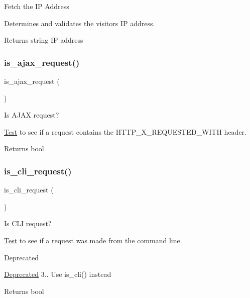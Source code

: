 Fetch the IP Address

Determines and validates the visitor\textquotesingle{}s IP address.

\begin{DoxyReturn}{Returns}
string IP address 
\end{DoxyReturn}
\mbox{\label{class_c_i___input_a4ae07120b0b2ace90eb2f7ec72b29426}} 
\subsubsection{\texorpdfstring{is\+\_\+ajax\+\_\+request()}{is\_ajax\_request()}}
{\footnotesize\ttfamily is\+\_\+ajax\+\_\+request (\begin{DoxyParamCaption}{ }\end{DoxyParamCaption})}

Is A\+J\+AX request?

\mbox{\hyperlink{class_test}{Test}} to see if a request contains the H\+T\+T\+P\+\_\+\+X\+\_\+\+R\+E\+Q\+U\+E\+S\+T\+E\+D\+\_\+\+W\+I\+TH header.

\begin{DoxyReturn}{Returns}
bool 
\end{DoxyReturn}
\mbox{\label{class_c_i___input_a70c1e8a081ef955c1a52164634d4f66e}} 
\subsubsection{\texorpdfstring{is\+\_\+cli\+\_\+request()}{is\_cli\_request()}}
{\footnotesize\ttfamily is\+\_\+cli\+\_\+request (\begin{DoxyParamCaption}{ }\end{DoxyParamCaption})}

Is C\+LI request?

\mbox{\hyperlink{class_test}{Test}} to see if a request was made from the command line.

\begin{DoxyRefDesc}{Deprecated}
\item[\mbox{\hyperlink{deprecated__deprecated000002}{Deprecated}}]3.. Use is\+\_\+cli() instead \end{DoxyRefDesc}
\begin{DoxyReturn}{Returns}
bool 
\end{DoxyReturn}
\mbox{\label{class_c_i___input_aaa22626885bdf9dda2346ee6422203ef}} 
